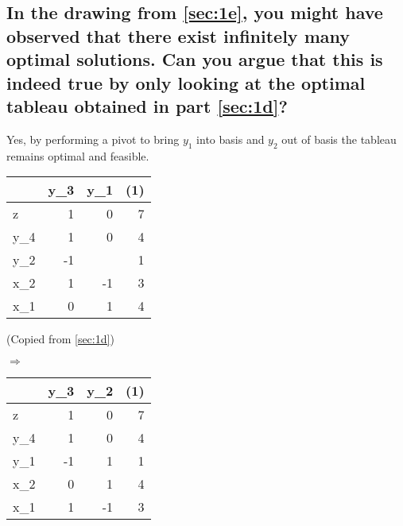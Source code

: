 \documentclass[12pt, a4]{article}
\newcommand{\lightgray}{black!30}
\newcommand{\plotDomain}{-1:8}
\newcommand{\addPlotLDownCoords}[1]{
	\addplot[mark=none, domain=\plotDomain, color=\lightgray,
	decoration={border,segment length=1mm,amplitude=1.5mm,angle=-135},
	postaction={decorate}
	] coordinates {#1};
	\addplot[mark=none, domain=\plotDomain] coordinates {#1};
}
\newcommand{\addPlotLDown}[1]{
	\addplot[mark=none, domain=\plotDomain, color=\lightgray,
	decoration={border,segment length=1mm,amplitude=1.5mm,angle=-135},
	postaction={decorate}
	] {#1};
	\addplot[mark=none, domain=\plotDomain] {#1};
}
\newcommand{\addPlotRUpCoords}[1]{
	\addplot[mark=none, domain=\plotDomain, color=\lightgray,
	decoration={border,segment length=1mm,amplitude=1.5mm,angle=135},
	postaction={decorate}
	] coordinates {#1};
	\addplot[mark=none, domain=\plotDomain] coordinates {#1};
}
\newcommand{\addPlotRUp}[1]{
	\addplot[mark=none, domain=\plotDomain, color=\lightgray,
	decoration={border,segment length=1mm,amplitude=1.5mm,angle=135},
	postaction={decorate}
	] {#1};
	\addplot[mark=none, domain=\plotDomain] {#1};
}
\begin{document}
{\begin{center}
\end{center}

\subsection{In the drawing from \ref{sec:1e}, you might have observed that there exist infinitely many optimal solutions. Can you argue that this is indeed true by only looking at the optimal tableau obtained in part \ref{sec:1d}?}

Yes, by performing a pivot to bring $y_1$ into basis and $y_2$ out of basis the tableau remains optimal and feasible.

\begin{minipage}[t]{.5\textwidth}
	\centering
	\begin{tabular}{L|RR||R}
		&  y_3 & y_1 & (1)  \\
		\hline
		z   & 1 & 0 & 7 \\
		\hline
		y_4 & 1 & 0 & 4 \\
		y_2 &-1 &  & 1 \\
		x_2 & 1 &-1 & 3 \\
		x_1 & 0 & 1 & 4 \\
	\end{tabular}

(Copied from \ref{sec:1d})
\end{minipage}
$\Rightarrow$
\begin{minipage}[t]{.5\textwidth}
	\centering
	\begin{tabular}{L|RR||R}
		&  y_3 & y_2 & (1)  \\
		\hline
		z   & 1 & 0 & 7 \\
		\hline
		y_4 & 1 & 0 & 4 \\
		y_1 &-1 & 1 & 1 \\
		x_2 & 0 & 1 & 4 \\
		x_1 & 1 &-1 & 3 \\
	\end{tabular}
\end{minipage}

}
\end{document}
